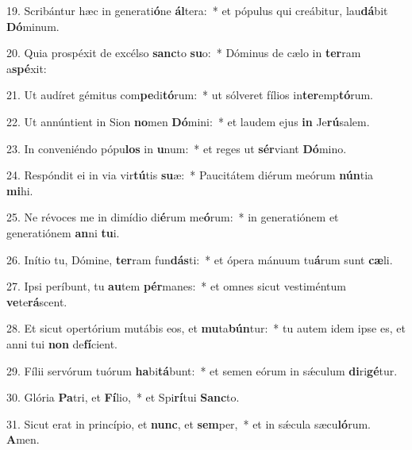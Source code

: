 19. Scribántur hæc in generati\textbf{ó}ne \textbf{ál}tera:~*  et pópulus qui creábitur, lau\textbf{dá}bit \textbf{Dó}minum.\

20. Quia prospéxit de excélso \textbf{sanc}to \textbf{su}o:~*  Dóminus de cælo in \textbf{ter}ram a\textbf{spé}xit:\

21. Ut audíret gémitus com\textbf{pe}di\textbf{tó}rum:~*  ut sólveret fílios in\textbf{ter}emp\textbf{tó}rum.\

22. Ut annúntient in Sion \textbf{no}men \textbf{Dó}mini:~*  et laudem ejus \textbf{in} Je\textbf{rú}salem.\

23. In conveniéndo pópu\textbf{los} in \textbf{u}num:~*  et reges ut \textbf{sér}viant \textbf{Dó}mino.\

24. Respóndit ei in via vir\textbf{tú}tis \textbf{su}æ:~*  Paucitátem diérum meórum \textbf{nún}tia \textbf{mi}hi.\

25. Ne révoces me in dimídio di\textbf{é}rum me\textbf{ó}rum:~*  in generatiónem et generatiónem \textbf{an}ni \textbf{tu}i.\

26. Inítio tu, Dómine, \textbf{ter}ram fun\textbf{dás}ti:~*  et ópera mánuum tu\textbf{á}rum sunt \textbf{cæ}li.\

27. Ipsi períbunt, tu \textbf{au}tem \textbf{pér}manes:~*  et omnes sicut vestiméntum \textbf{ve}te\textbf{rá}scent.\

28. Et sicut opertórium mutábis eos, et \textbf{mu}ta\textbf{bún}tur:~*  tu autem idem ipse es, et anni tui \textbf{non} de\textbf{fí}cient.\

29. Fílii servórum tuórum \textbf{ha}bi\textbf{tá}bunt:~*  et semen eórum in sǽculum \textbf{di}ri\textbf{gé}tur.\

30. Glória \textbf{Pa}tri, et \textbf{Fí}lio,~*  et Spi\textbf{rí}tui \textbf{Sanc}to.\

31. Sicut erat in princípio, et \textbf{nunc}, et \textbf{sem}per,~*  et in sǽcula sæcu\textbf{ló}rum. \textbf{A}men.\

